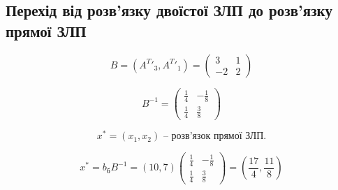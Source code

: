 \documentclass[a4paper, 12pt]{article}
\begin{document}
\subsection{ Перехід від розв'язку двоїстої ЗЛП до розв'язку прямої ЗЛП }

\begin{equation*}
	B = \left(A^T{'}_3, A^T{'}_1\right) = 
	\begin{pmatrix*}
		3 & 1\\
		-2 & 2
	\end{pmatrix*}
\end{equation*}

\begin{equation*}
	B^{-1} = 
	\begin{pmatrix*}
		\frac{1}{4} & -\frac{1}{8}\\
		\frac{1}{4} & \frac{3}{8}
	\end{pmatrix*}
\end{equation*}

\begin{equation*}
	x^* = (x_1, x_2) \text{ -- розв'язок прямої ЗЛП}.
\end{equation*}

\begin{equation*}
	x^* = b_{\text{б}}B^{-1} = (10,7)
	\begin{pmatrix*}
		\frac{1}{4} & -\frac{1}{8}\\
		\frac{1}{4} & \frac{3}{8}
	\end{pmatrix*} = \left(\frac{17}{4}, \frac{11}{8}\right)
\end{equation*}
\end{document}
